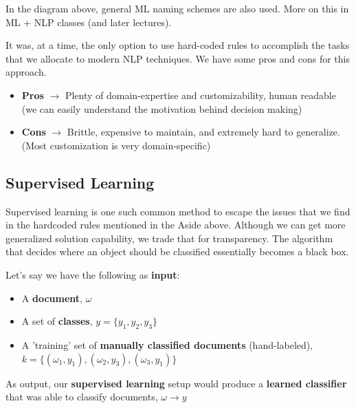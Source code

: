 \documentclass[english, 10pt]{article}
\begin{document}
{\begin{tikzpicture}[x=0.75pt,y=0.75pt,yscale=-1,xscale=1]
\end{tikzpicture}


}

\hfill \break In the diagram above, general ML naming schemes are also used. More on this in ML + NLP classes (and later lectures).\\

\begin{tcolorbox}[title=Aside: Hardcoded Rules,colframe=black,colback=white,arc=0pt,fonttitle=\bfseries]

It was, at a time, the only option to use hard-coded rules to accomplish the tasks that we allocate to modern NLP techniques. We have some pros and cons for this approach.
\begin{itemize}
	\item \textbf{Pros} $\rightarrow$ Plenty of domain-expertise and customizability, human readable (we can easily understand the motivation behind decision making)
	\item \textbf{Cons} $\rightarrow$ Brittle, expensive to maintain, and extremely hard to generalize. (Most customization is very domain-specific)
\end{itemize}

\end{tcolorbox}


\subsection{Supervised Learning}

Supervised learning is one such common method to escape the issues that we find in the hardcoded rules mentioned in the Aside above. Although we can get more generalized solution capability, we trade that for transparency. The algorithm that decides where an object should be classified essentially becomes a black box.

\begin{myproof}
Let's say we have the following as \textbf{input}:

\begin{itemize}
	\item A \textbf{document}, $\omega$
	\item A set of \textbf{classes}, $y=\{y_1,y_2,y_3\}$
	\item A 'training' set of \textbf{manually classified documents} (hand-labeled),\\ $k=\{(\omega _1, y_1),(\omega _2, y_3),(\omega _3, y_1)\}$
\end{itemize}

As output, our \textbf{supervised learning} setup would produce a \textbf{learned classifier} that was able to classify documents, $\omega \rightarrow y$ 
\end{myproof}
\end{document}
